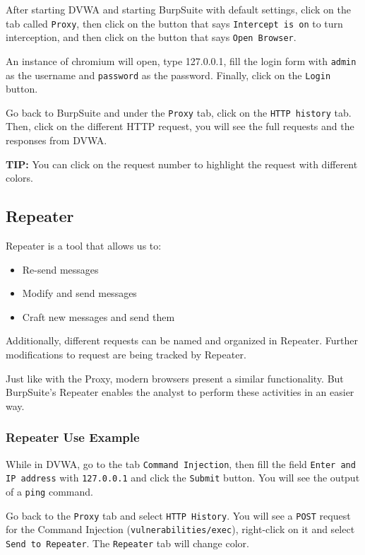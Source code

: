 \documentclass[twocolumn]{article}
\begin{document}
After starting DVWA\cite{dvwa} and starting BurpSuite with default settings, click on the tab called \texttt{Proxy}, then click on the button that says \texttt{Intercept is on} to turn interception, and then click on the button that says \texttt{Open Browser}.

An instance of chromium will open, type 127.0.0.1, fill the login form with \texttt{admin} as the username and \texttt{password} as the password. Finally, click on the \texttt{Login} button.

Go back to BurpSuite and under the \texttt{Proxy} tab, click on the \texttt{HTTP history} tab. Then, click on the different HTTP request, you will see the full requests and the responses from DVWA.

\textbf{TIP:} You can click on the request number to highlight the request with different colors.

\subsection{Repeater}

Repeater is a tool that allows us to:

\begin{itemize}
    \item Re-send messages
    \item Modify and send messages
    \item Craft new messages and send them
\end{itemize}

Additionally, different requests can be named and organized in Repeater. Further modifications to request are being tracked by Repeater.

Just like with the Proxy, modern browsers present a similar functionality. But BurpSuite's Repeater enables the analyst to perform these activities in an easier way.

\subsubsection{Repeater Use Example}

While in DVWA, go to the tab \texttt{Command Injection}, then fill the field \texttt{Enter and IP address} with \texttt{127.0.0.1} and click the \texttt{Submit} button. You will see the output of a \texttt{ping} command.

Go back to the \texttt{Proxy} tab and select \texttt{HTTP History}. You will see a \texttt{POST} request for the {Command Injection} (\texttt{vulnerabilities/exec}), right-click on it and select \texttt{Send to Repeater}. The \texttt{Repeater} tab will change color.
\end{document}
